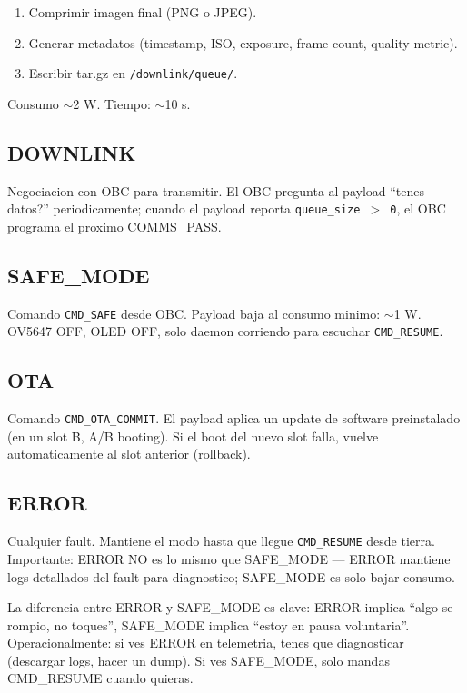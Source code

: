 \documentclass[11pt,a4paper,oneside,openright]{book}
\begin{document}
\begin{enumerate}[leftmargin=2em]
  \item Comprimir imagen final (PNG o JPEG).
  \item Generar metadatos (timestamp, ISO, exposure, frame count,
    quality metric).
  \item Escribir tar.gz en \texttt{/downlink/queue/}.
\end{enumerate}

Consumo $\sim$2 W. Tiempo: $\sim$10 s.

\subsection*{DOWNLINK}

Negociacion con OBC para transmitir. El OBC pregunta al payload
``tenes datos?'' periodicamente; cuando el payload reporta
\texttt{queue\_size $>$ 0}, el OBC programa el proximo COMMS\_PASS.

\subsection*{SAFE\_MODE}

Comando \texttt{CMD\_SAFE} desde OBC. Payload baja al consumo
minimo: $\sim$1 W. OV5647 OFF, OLED OFF, solo daemon corriendo
para escuchar \texttt{CMD\_RESUME}.

\subsection*{OTA}

Comando \texttt{CMD\_OTA\_COMMIT}. El payload aplica un update de
software preinstalado (en un slot B, A/B booting). Si el boot del
nuevo slot falla, vuelve automaticamente al slot anterior (rollback).

\subsection*{ERROR}

Cualquier fault. Mantiene el modo hasta que llegue \texttt{CMD\_RESUME}
desde tierra. Importante: ERROR NO es lo mismo que SAFE\_MODE ---
ERROR mantiene logs detallados del fault para diagnostico; SAFE\_MODE
es solo bajar consumo.

\begin{payloadbox}
La diferencia entre ERROR y SAFE\_MODE es clave: ERROR implica
``algo se rompio, no toques'', SAFE\_MODE implica ``estoy en pausa
voluntaria''. Operacionalmente: si ves ERROR en telemetria, tenes
que diagnosticar (descargar logs, hacer un dump). Si ves SAFE\_MODE,
solo mandas CMD\_RESUME cuando quieras.
\end{payloadbox}
\end{document}
